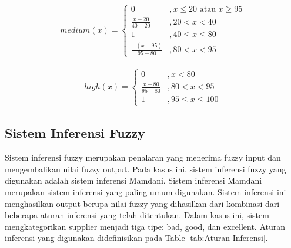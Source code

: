\documentclass[titlepage]{article}
\begin{document}
            \begin{equation}
                \begin{split}
                    medium(x) = \begin{cases}
                        0 &, x \le 20 \text{ atau } x \ge 95 \\
                        \frac{x - 20}{40-20} &, 20 < x < 40 \\
                        1 &, 40 \le x \le 80 \\
                        \frac{-(x - 95)}{95-80} &, 80 < x < 95
                    \end{cases}
                \end{split}
            \end{equation}

            \begin{equation}
                \begin{split}
                    high(x) = \begin{cases}
                        0 &, x < 80 \\
                        \frac{x - 80}{95-80} &, 80 < x < 95 \\
                        1 &, 95 \le x \le 100
                    \end{cases}
                \end{split}
            \end{equation}

        \subsection{Sistem Inferensi Fuzzy}
            Sistem inferensi fuzzy merupakan penalaran yang menerima fuzzy input dan mengembalikan nilai fuzzy output. Pada kasus ini, sistem inferensi fuzzy yang digunakan adalah sistem inferensi Mamdani. Sistem inferensi Mamdani merupakan sistem inferensi yang paling umum digunakan. Sistem inferensi ini menghasilkan output berupa nilai fuzzy yang dihasilkan dari kombinasi dari beberapa aturan inferensi yang telah ditentukan. Dalam kasus ini, sistem mengkategorikan supplier menjadi tiga tipe: bad, good, dan excellent. Aturan inferensi yang digunakan didefinisikan pada Table \ref{tab:Aturan Inferensi}.
\end{document}
